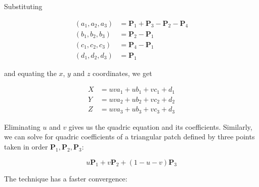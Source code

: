 Substituting

\begin{equation}
	\begin{split}
		(a_1,a_2,a_3)&=\mathbf{P}_{1}+\mathbf{P}_{3}-\mathbf{P}_{2}-\mathbf{P}_{4}\\
		(b_1,b_2,b_3)&=\mathbf{P}_{2}-\mathbf{P}_{1}\\
		(c_1,c_2,c_3)&=\mathbf{P}_{4}-\mathbf{P}_{1}\\
		(d_1,d_2,d_3)&=\mathbf{P}_{1}
	\end{split}
\end{equation}

and equating the $x$, $y$ and $z$ coordinates, we get


\begin{equation}
	\begin{split}
		X&=uva_1+ub_1+vc_1+d_1\\
		Y&=uva_2+ub_2+vc_2+d_2\\
		Z&=uva_3+ub_3+vc_3+d_3
	\end{split}
\end{equation}


Eliminating $u$ and $v$ gives us the quadric equation and its coefficients. Similarly, we can solve for quadric coefficients of a triangular patch defined by three points taken in order $\mathbf{P}_{1},\mathbf{P}_{2},\mathbf{P}_{3}$:

\begin{equation}
	u\mathbf{P}_{1}+v\mathbf{P}_{2}+(1-u-v)\mathbf{P}_{3}
\end{equation}

The technique has a faster convergence:

